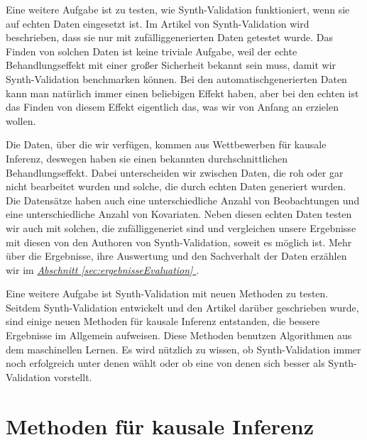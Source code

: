 \documentclass[12pt,a4paper,twoside]{scrartcl}
\numberwithin{equation}{section}
\newcommand{\refsec}[1]{\emph{\hyperref[#1]{Abschnitt \ref*{#1} }}}
\begin{document}
\noindent
Eine weitere Aufgabe ist zu testen, wie Synth-Validation funktioniert, wenn sie auf echten Daten eingesetzt ist. Im Artikel von Synth-Validation wird beschrieben, dass sie nur mit zufälliggenerierten Daten getestet wurde. Das Finden von solchen Daten ist keine triviale Aufgabe, weil der echte Behandlungseffekt mit einer großer Sicherheit bekannt sein muss, damit wir Synth-Validation benchmarken können. Bei den automatischgenerierten Daten kann man natürlich immer einen beliebigen Effekt haben, aber bei den echten ist das Finden von diesem Effekt eigentlich das, was wir von Anfang an erzielen wollen.\par

\noindent
Die Daten, über die wir verfügen, kommen aus Wettbewerben für kausale Inferenz, deswegen haben sie einen bekannten durchschnittlichen Behandlungseffekt. Dabei unterscheiden wir zwischen Daten, die roh oder gar nicht bearbeitet wurden und solche, die durch echten Daten generiert wurden. Die Datensätze haben auch eine unterschiedliche Anzahl von Beobachtungen und eine unterschiedliche Anzahl von Kovariaten. Neben diesen echten Daten testen wir auch mit solchen, die zufälliggeneriet sind und vergleichen unsere Ergebnisse mit diesen von den Authoren von Synth-Validation, soweit es möglich ist. Mehr über die Ergebnisse, ihre Auswertung und den Sachverhalt der Daten erzählen wir im \refsec{sec:ergebnisseEvaluation}.\par 

\noindent
Eine weitere Aufgabe ist Synth-Validation mit neuen Methoden zu testen. Seitdem Synth-Validation entwickelt und den Artikel darüber geschrieben wurde, sind einige neuen Methoden für kausale Inferenz entstanden, die bessere Ergebnisse im Allgemein aufweisen. Diese Methoden benutzen Algorithmen aus dem maschinellen Lernen. Es wird nützlich zu wissen, ob Synth-Validation immer noch erfolgreich unter denen wählt oder ob eine von denen sich besser als Synth-Validation vorstellt.\par

\clearpage

\section{Methoden für kausale Inferenz}\label{sec:methoden}
\end{document}
